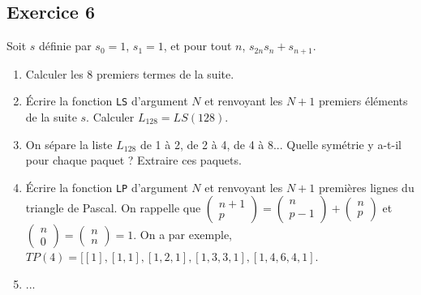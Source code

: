 \documentclass[10pt,fleqn]{article} %
\begin{document}
\begin{multicols}{2}
\subsection*{Exercice 6}
Soit $s$ définie par $s_0=1$,  $s_1=1$, et pour tout $n$, $s_{2n}s_n+s_{n+1}$. 
\begin{enumerate}
\item Calculer les 8 premiers termes de la suite.
\item Écrire la fonction \texttt{LS} d'argument $N$ et renvoyant les $N+1$ premiers éléments de la suite $s$. Calculer $L_{128}=LS(128)$. 
\item On sépare la liste $L_{128}$ de 1 à 2, de 2 à 4, de 4 à 8... Quelle symétrie y a-t-il pour chaque paquet ? Extraire ces paquets.
\item Écrire la fonction \texttt{LP} d'argument $N$ et renvoyant les $N+1$ premières lignes du triangle de Pascal. On rappelle que $\begin{pmatrix}n+1 \\ p \end{pmatrix}=\begin{pmatrix}n \\ p-1 \end{pmatrix}+\begin{pmatrix}n \\ p \end{pmatrix}$ et $\begin{pmatrix}n \\ 0 \end{pmatrix} = \begin{pmatrix}n \\ n \end{pmatrix}=1$.
On a par exemple, $TP(4)=[[1],[1,1],[1,2,1],[1,3,3,1],[1,4,6,4,1]$.
\item ...
\end{enumerate} 








\end{multicols}
\end{document}
